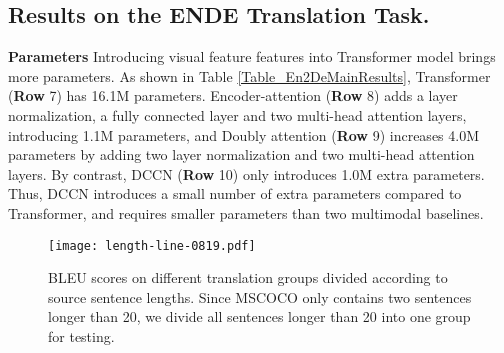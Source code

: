 \documentclass[sigconf]{acmart}
\begin{document}
\subsection{Results on the ENDE Translation Task.}

\textbf{Parameters} Introducing visual feature features into Transformer model brings more parameters. As shown in Table \ref{Table_En2DeMainResults}, Transformer (\textbf{Row} 7) has 16.1M parameters. Encoder-attention (\textbf{Row} 8) adds a layer normalization, a fully connected layer and two multi-head attention layers, introducing 1.1M parameters, and Doubly attention (\textbf{Row} 9) increases 4.0M parameters by adding two layer normalization and two multi-head attention layers. By contrast, DCCN (\textbf{Row} 10) only introduces 1.0M extra parameters. Thus, DCCN introduces a small number of extra parameters compared to Transformer, and requires smaller parameters than two multimodal baselines. 

\iffalse
\textbf{Speed} When running on a single GPU device GeForce GTX 1080Ti, the speed of Transformer is about 12,000 target tokens per second. Apparently, introducing visual features to the model slows down the training speed. Specifically, Encoder-attention has a speed of 2,500 tokens per second, and Doubly-attention can generate 2,200 tokens per second. Compared with these two multimodal baselines, the speed of DCCN declines further, achieving about 1,900 tokens per second.
\fi


\begin{figure*}[!t]
\centering
\texttt{[image: length-line-0819.pdf]}
\caption{
\label{Fig_En2De_LengthEffect}
BLEU scores on different translation groups divided according to source sentence lengths. Since MSCOCO only contains two sentences longer than 20, we divide all sentences longer than 20 into one group for testing. 
}
\end{figure*}
\end{document}
